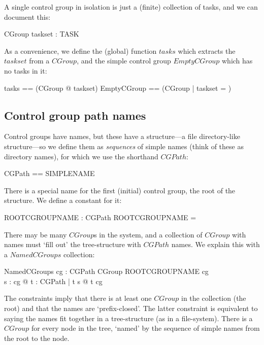 \documentclass[a4paper,twoside,12pt]{article}
\begin{document}
A single control group in isolation is just a (finite) collection of tasks, and we can document this:

\begin{schema}{CGroup}
taskset : \finset TASK
\end{schema}

As a convenience, we define the (global) function $tasks$ which extracts the $taskset$ from a $CGroup$, and the
simple control group $EmptyCGroup$ which has no tasks in it:
\begin{zed}
tasks == (\lambda CGroup @ taskset)
\also
EmptyCGroup == (\mu CGroup | taskset = \emptyset )
\end{zed}

\subsection{Control group path names}

Control groups have names, but these have a structure---a file directory-like structure---so we define them as \emph{sequences} of simple names 
(think of these as directory names), for which we use the shorthand $CGPath$:

\begin{zed}
CGPath == \seq SIMPLENAME
\end{zed}

There is a special name for the first (initial) control group, the root of the structure. We define a constant for it:

\begin{axdef}{}
ROOTCGROUPNAME : CGPath
\where
ROOTCGROUPNAME = \langle \rangle
\end{axdef}

There may be many $CGroup$s in the system, and a collection of $CGroup$ with names must `fill out' the tree-structure with $CGPath$ names. 
We explain this with a $NamedCGroups$ collection:

\begin{schema}{NamedCGroups}
cg : CGPath \ffun CGroup
\where
ROOTCGROUPNAME \in \dom cg \\
\forall s : \dom cg @ \forall t : CGPath | t \subset s @ t \in \dom cg
\end{schema}
The constraints imply that there is  at least one $CGroup$ in the collection (the root) and that the names are `prefix-closed'. The latter constraint is equivalent to saying the names fit together in a tree-structure (as in a file-system).
There is a $CGroup$ for every node in the tree, `named' by the sequence of simple names from the root to the node.
\end{document}
